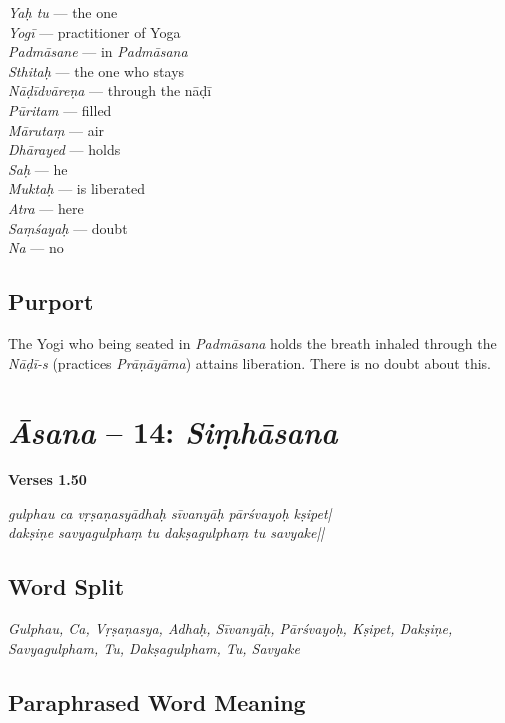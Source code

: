 \begin{multicols}{2}
\textit{Yaḥ tu} --- the one   \\
\textit{Yogī} --- practitioner of Yoga \\
\textit{Padmāsane} ---  in \textit{Padmāsana} \\
\textit{Sthitaḥ} --- the one who stays  \\
\textit{Nāḍīdvāreṇa} ---  through the nāḍī \\
\textit{Pūritam} --- filled  \\
\textit{Mārutaṃ} ---  air  \\
\textit{Dhārayed} ---  holds  \\
\textit{Saḥ} ---  he  \\
\textit{Muktaḥ} --- is liberated \\
\textit{Atra} --- here  \\
\textit{Saṃśayaḥ} --- doubt\\
\textit{Na} ---  no
\end{multicols}

\subsection*{Purport}

The Yogi who being seated in \textit{Padmāsana} holds the breath inhaled through the \textit{Nāḍī-s} (practices \textit{Prāṇāyāma}) attains liberation. There is no doubt about this.

\section*{\textit{Āsana} -- 14: \textit{Siṃhāsana}}


\noindent \textbf{Verses 1.50}

\begin{shloka}
\textit{gulphau ca vṛṣaṇasyādhaḥ sīvanyāḥ pārśvayoḥ kṣipet|\\
dakṣiṇe savyagulphaṃ tu dakṣagulphaṃ tu savyake||}
\end{shloka}

\subsection*{Word Split}

\textit{Gulphau, Ca, Vṛṣaṇasya, Adhaḥ, Sīvanyāḥ, Pārśvayoḥ, Kṣipet, Dakṣiṇe, Savyagulpham, Tu, Dakṣagulpham, Tu, Savyake}
\newpage
\subsection*{Paraphrased Word Meaning}

